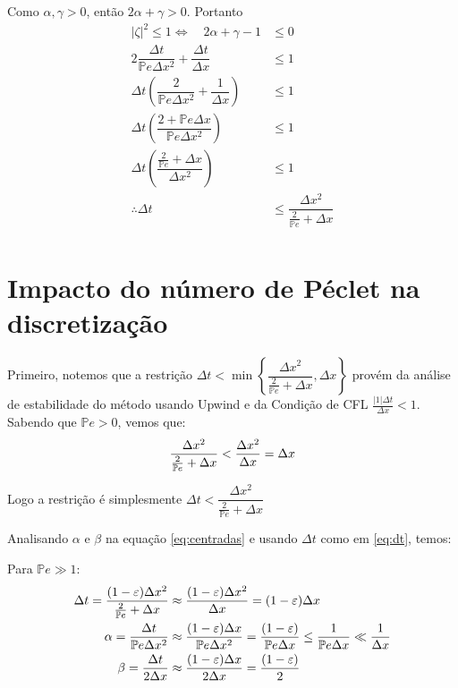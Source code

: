 \documentclass[12pt, a4paper]{article}
\newcommand{\bb}[1]{\mathbb{#1}}
\newcommand{\D}[1]{\Delta#1}
\newcommand{\Pe}{\bb{P}e}
\begin{document}
    Como $\alpha,\gamma > 0$, então $2\alpha+\gamma > 0$. Portanto
    \[\begin{split}
        |\zeta|^2 \leq 1 \iff\quad 2\alpha+\gamma-1 &\leq 0\\
        2\dfrac{\D{t}}{\bb{P}e\D{x^2}} + \dfrac{\D{t}}{\D{x}} &\leq 1\\
        \D{t}\left(\dfrac{2}{\bb{P}e\D{x^2}} + \dfrac{1}{\D{x}}\right) &\leq 1\\
        \D{t}\left(\dfrac{2+\bb{P}e\D{x}}{\bb{P}e\D{x^2}}\right) &\leq 1\\
        \D{t}\left(\dfrac{\frac{2}{\bb{P}e}+\D{x}}{\D{x^2}}\right) &\leq 1\\
        \therefore \D{t} &\leq \dfrac{\D{x^2}}{\frac{2}{\bb{P}e}+\D{x}}\\
    \end{split}\]



    \section{Impacto do número de Péclet na discretização}
    \label{sec:peclet}
    Primeiro, notemos que a restrição $\Delta t < \min\left\{ \dfrac{\Delta x^2}{\frac{2}{\bb{P}e} + \Delta x}, \Delta x \right\}$ provém da análise de estabilidade do método usando Upwind e da Condição de CFL $\frac{|1|\D{t}}{\D{x}} < 1$. Sabendo que $\Pe > 0$, vemos que:
    \begin{align}
        \frac{\Delta x^2}{\frac{2}{\bb{P}e}+ \D{x}} < \frac{\Delta x^2}{\D{x}} = \D{x} \notag
    \end{align}

    Logo a restrição é simplesmente $\Delta t < \dfrac{\Delta x^2}{\frac{2}{\bb{P}e} + \Delta x}$

    Analisando $\alpha$ e $\beta$ na equação \ref{eq:centradas} e usando $\D{t}$ como em \ref{eq:dt}, temos:

    Para $\Pe \gg 1$:
    \begin{align}
        \D{t} = \frac{(1-\varepsilon)\D{x^2}}{\frac{2}{\Pe} + \D{x}} &\approx \frac{(1-\varepsilon)\D{x^2}}{\D{x}} = (1-\varepsilon) \D{x} \notag \\
        \alpha = \frac{\D{t}}{\Pe \D{x^2}} &\approx \frac{(1-\varepsilon) \D{x}}{\Pe \D{x^2}} = \frac{(1-\varepsilon)}{\Pe \D{x}} \le \frac{1}{\Pe \D{x}} \ll \frac{1}{\D{x}} \notag \\
        \beta = \frac{\D{t}}{2 \D{x}} &\approx \frac{(1- \varepsilon) \D{x}}{2 \D{x}} = \frac{(1 - \varepsilon)}{2} \notag
    \end{align}
\end{document}
